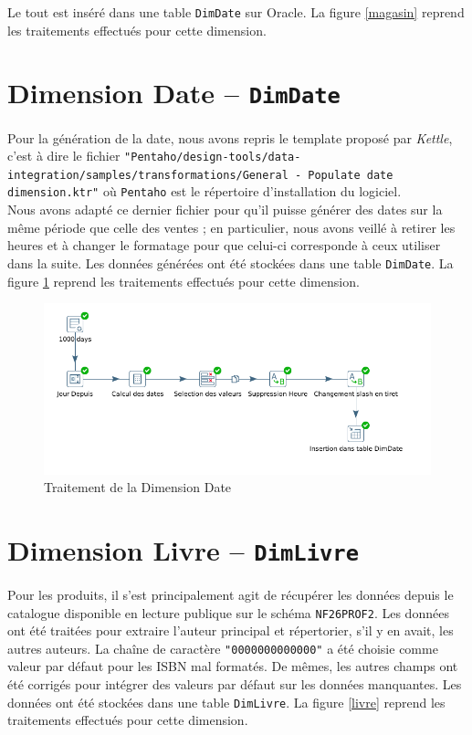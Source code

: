   	Le tout est inséré dans une table \texttt{DimDate} sur Oracle. La figure \ref{magasin} reprend les traitements effectués pour cette dimension.

\section{Dimension Date -- \texttt{DimDate}}

	Pour la génération de la date, nous avons repris le template proposé par \textit{Kettle}, c'est à dire le fichier \texttt{"Pentaho/design-tools/data-integration/samples/transformations/General - Populate date dimension.ktr"} où \texttt{Pentaho} est le répertoire d'installation du logiciel.\\
	
	Nous avons adapté ce dernier fichier pour qu'il puisse générer des dates sur la même période que celle des ventes ; en particulier, nous avons veillé à retirer les heures et à changer le formatage pour que celui-ci corresponde à ceux utiliser dans la suite. Les données générées ont été stockées dans une table \texttt{DimDate}. La figure \ref{date} reprend les traitements effectués pour cette dimension.


	\begin{figure}[H]
      \centerline{\includegraphics[width=\textwidth]{../TD2/screenshots/screenScriptDimDate.png}}
      \caption{Traitement de la Dimension Date}
      \label{date}
  	\end{figure}
  	

\section{Dimension Livre -- \texttt{DimLivre}}

	Pour les produits, il s'est principalement agit de récupérer les données depuis le catalogue disponible en lecture publique sur le schéma \texttt{NF26PROF2}. Les données ont été traitées pour extraire l'auteur principal et répertorier, s'il y en avait, les autres auteurs. La chaîne de caractère \texttt{"0000000000000"} a été choisie comme valeur par défaut pour les ISBN mal formatés. De mêmes, les autres champs ont été corrigés pour intégrer des valeurs par défaut sur les données manquantes. Les données ont été stockées dans une table \texttt{DimLivre}. La figure \ref{livre} reprend les traitements effectués pour cette dimension.


